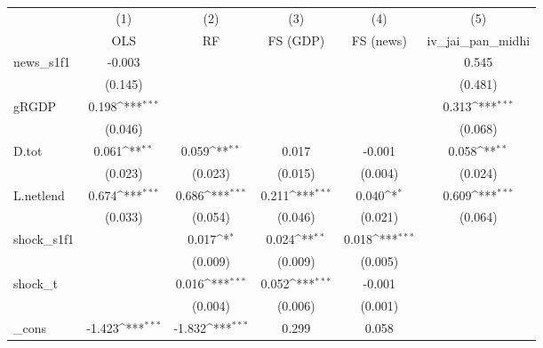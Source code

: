 {
\def\sym#1{\ifmmode^{#1}\else\(^{#1}\)\fi}
\begin{tabular}{l*{5}{c}}
\toprule
            &\multicolumn{1}{c}{(1)}&\multicolumn{1}{c}{(2)}&\multicolumn{1}{c}{(3)}&\multicolumn{1}{c}{(4)}&\multicolumn{1}{c}{(5)}\\
            &\multicolumn{1}{c}{OLS}&\multicolumn{1}{c}{RF}&\multicolumn{1}{c}{FS (GDP)}&\multicolumn{1}{c}{FS (news)}&\multicolumn{1}{c}{iv\_jai\_pan\_midhi}\\
\midrule
news\_s1f1   &      -0.003         &                     &                     &                     &       0.545         \\
            &     (0.145)         &                     &                     &                     &     (0.481)         \\
\addlinespace
gRGDP       &       0.198\sym{***}&                     &                     &                     &       0.313\sym{***}\\
            &     (0.046)         &                     &                     &                     &     (0.068)         \\
\addlinespace
D.tot       &       0.061\sym{**} &       0.059\sym{**} &       0.017         &      -0.001         &       0.058\sym{**} \\
            &     (0.023)         &     (0.023)         &     (0.015)         &     (0.004)         &     (0.024)         \\
\addlinespace
L.netlend   &       0.674\sym{***}&       0.686\sym{***}&       0.211\sym{***}&       0.040\sym{*}  &       0.609\sym{***}\\
            &     (0.033)         &     (0.054)         &     (0.046)         &     (0.021)         &     (0.064)         \\
\addlinespace
shock\_s1f1  &                     &       0.017\sym{*}  &       0.024\sym{**} &       0.018\sym{***}&                     \\
            &                     &     (0.009)         &     (0.009)         &     (0.005)         &                     \\
\addlinespace
shock\_t     &                     &       0.016\sym{***}&       0.052\sym{***}&      -0.001         &                     \\
            &                     &     (0.004)         &     (0.006)         &     (0.001)         &                     \\
\addlinespace
\_cons      &      -1.423\sym{***}&      -1.832\sym{***}&       0.299         &       0.058         &                     \\

\end{tabular}}
